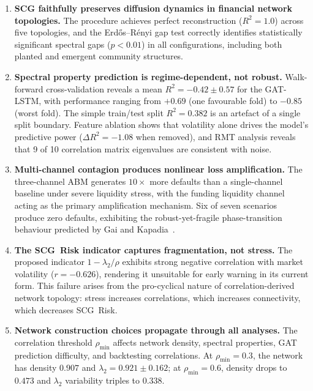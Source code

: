 \begin{enumerate}
    \item \textbf{SCG faithfully preserves diffusion dynamics in financial network topologies.} The procedure achieves perfect reconstruction ($R^2 = 1.0$) across five topologies, and the Erd\H{o}s--R\'{e}nyi gap test correctly identifies statistically significant spectral gaps ($p < 0.01$) in all configurations, including both planted and emergent community structures.

    \item \textbf{Spectral property prediction is regime-dependent, not robust.} Walk-forward cross-validation reveals a mean $R^2 = -0.42 \pm 0.57$ for the GAT-LSTM, with performance ranging from $+0.69$ (one favourable fold) to $-0.85$ (worst fold). The simple train/test split $R^2 = 0.382$ is an artefact of a single split boundary. Feature ablation shows that volatility alone drives the model's predictive power ($\Delta R^2 = -1.08$ when removed), and RMT analysis reveals that 9 of 10 correlation matrix eigenvalues are consistent with noise.

    \item \textbf{Multi-channel contagion produces nonlinear loss amplification.} The three-channel ABM generates $10\times$ more defaults than a single-channel baseline under severe liquidity stress, with the funding liquidity channel acting as the primary amplification mechanism. Six of seven scenarios produce zero defaults, exhibiting the robust-yet-fragile phase-transition behaviour predicted by Gai and Kapadia~\cite{gai2010contagion}.

    \item \textbf{The SCG~Risk indicator captures fragmentation, not stress.} The proposed indicator $1 - \lambda_2/\rho$ exhibits strong negative correlation with market volatility ($r = -0.626$), rendering it unsuitable for early warning in its current form. This failure arises from the pro-cyclical nature of correlation-derived network topology: stress increases correlations, which increases connectivity, which decreases SCG~Risk.

    \item \textbf{Network construction choices propagate through all analyses.} The correlation threshold $\rho_{\min}$ affects network density, spectral properties, GAT prediction difficulty, and backtesting correlations. At $\rho_{\min} = 0.3$, the network has density $0.907$ and $\lambda_2 = 0.921 \pm 0.162$; at $\rho_{\min} = 0.6$, density drops to $0.473$ and $\lambda_2$ variability triples to $0.338$.
\end{enumerate}


